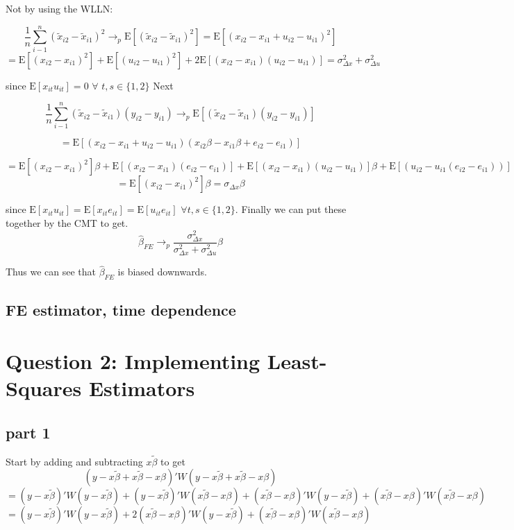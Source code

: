 \documentclass[11pt]{article}
\newcommand{\plim}{\rightarrow_{p}}
\newcommand{\E}{\mathrm{E}}
\begin{document}
 Not by using the WLLN:
 
 $$ \frac{1}{n} \sum_{i-1}^{n}(\tilde{x}_{i2} - \tilde{x}_{i1} )^2 \plim \E[(\tilde{x}_{i2} - \tilde{x}_{i1} )^2]
  = \E[(x_{i2} - x_{i1} + u_{i2} - u_{i1})^2]$$
  $$ =  \E[(x_{i2} - x_{i1})^2] +\E[(u_{i2} - u_{i1})^2] +2\E[(x_{i2} - x_{i1})(u_{i2}-u_{i1})] = \sigma_{\Delta x}^2 + \sigma_{\Delta u}^2
  $$
  
  since $\E[x_{it}u_{it}] = 0$ $\forall$ $t,s \in \{1,2\}$ Next 
  
  $$\frac{1}{n} \sum_{i-1}^{n}(\tilde{x}_{i2} - \tilde{x}_{i1} )(y_{i2} - y_{i1}) \plim \E[(\tilde{x}_{i2} - \tilde{x}_{i1} )(y_{i2} - y_{i1})]$$
  
  $$ = \E[(x_{i2} - x_{i1} + u_{i2} -u_{i1})(x_{i2}\beta - x_{i1}\beta + e_{i2} - e_{i1})]$$
  
  $$ = \E[(x_{i2}-x_{i1})^2]\beta + \E[(x_{i2}-x_{i1})(e_{i2}-e_{i1})] + \E[(x_{i2}-x_{i1})( u_{i2} -u_{i1})]\beta + \E[(u_{i2} - u_{i1}(e_{i2} - e_{i1}))]
$$
$$ = \E[(x_{i2} - x_{i1})^2]\beta = \sigma_{\Delta x}\beta $$

since $\E[x_{it}u_{it}] = \E[x_{it}e_{it}] =  \E[u_{it}e_{it}] $ $\forall t,s \in \{1,2\}$. Finally we can put these together by the CMT to get. 
$$ \hat{\beta}_{FE} \plim \frac{\sigma_{\Delta x}^2}{\sigma_{\Delta x}^2 + \sigma_{\Delta u}^2} \beta
$$

Thus we can see that $\hat{\beta}_{FE}$ is biased downwards.

\subsection{FE estimator, time dependence}

\section{Question 2: Implementing Least-Squares Estimators}

\subsection{part 1}

Start by adding and subtracting $x \tilde{\beta}$ to get 
$$ (y-x\tilde{\beta} + x\tilde{\beta} - x\beta)'W(y-x\tilde{\beta} + x\tilde{\beta} - x\beta) $$
$$ = (y-x\tilde{\beta})'W(y-x\tilde{\beta}) + (y-x\tilde{\beta})'W(x\tilde{\beta} - x\beta) + (x\tilde{\beta} - x\beta)'W(y-x\tilde{\beta}) + (x\tilde{\beta} - x\beta)'W(x\tilde{\beta} - x\beta)$$
$$ = (y-x\tilde{\beta})'W(y-x\tilde{\beta}) + 2(x\tilde{\beta} - x\beta)'W(y-x\tilde{\beta}) + (x\tilde{\beta} - x\beta)'W(x\tilde{\beta} - x\beta)$$
\end{document}
